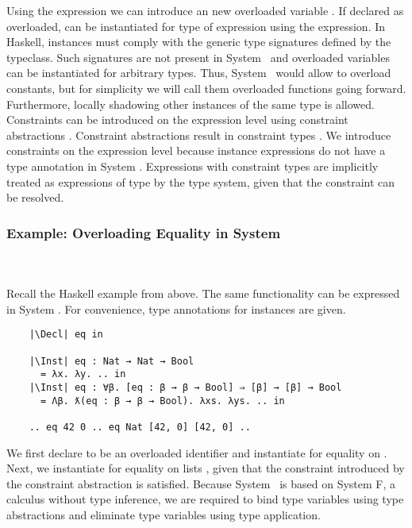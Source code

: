 \noindent Using the  expression we can introduce an new overloaded variable . 
If declared as overloaded,  can be instantiated for type  of expression  using the  expression.
In Haskell, instances must comply with the generic type signatures defined by the typeclass. Such signatures are not present in System \Fo\ and overloaded variables can be instantiated for arbitrary types. Thus, System \Fo\ would allow to overload constants, but for simplicity we will call them overloaded functions going forward.
Furthermore, locally shadowing other instances of the same type is allowed. 
Constraints can be introduced on the expression level using constraint abstractions . 
Constraint abstractions result in constraint types . 
We introduce constraints on the expression level because instance expressions do not have a type annotation in System \Fo.
Expressions with constraint types  are implicitly treated as expressions of type  by the type system, given that the constraint  can be resolved.

\subsubsection{Example: Overloading Equality in System \Fo}\hfill\\\\
Recall the Haskell example from above. 
The same functionality can be expressed in System \Fo. 
For convenience, type annotations for instances are given.
\begin{verbatim}
    |\Decl| eq in

    |\Inst| eq : Nat → Nat → Bool 
      = λx. λy. .. in
    |\Inst| eq : ∀β. [eq : β → β → Bool] ⇒ [β] → [β] → Bool 
      = Λβ. ƛ(eq : β → β → Bool). λxs. λys. .. in

    .. eq 42 0 .. eq Nat [42, 0] [42, 0] .. 
\end{verbatim} 
We first declare  to be an overloaded identifier and instantiate  for equality on . 
Next, we instantiate  for equality on lists \inl{[β]}, given that the constraint  introduced by the constraint abstraction is satisfied. 
Because System \Fo\ is based on System F, a calculus without type inference, we are required to bind type variables using type abstractions  and eliminate type variables using type application. 

